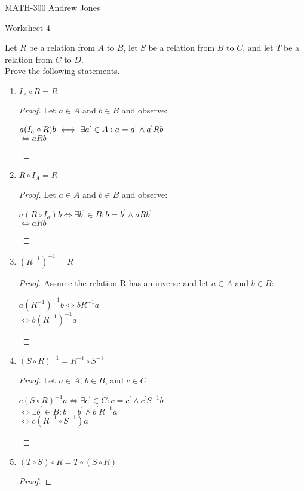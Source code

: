 \documentclass{article}
\begin{document}
    MATH-300 \hfill Andrew Jones
  \begin{center}
  {\huge Worksheet 4}
  \end{center}
  Let $R$ be a relation from $A$ to $B$, let $S$ be a relation from $B$ to $C$, and let $T$ be a relation from $C$ to $D$. \\ Prove the following statements. \\
  \begin{enumerate}
    \item $I_A \circ R = R$
      \begin{proof}
        Let $a\in A$ and $b\in B$ and observe:
        \begin{center}
          $a(I_a \circ R)b \iff \exists a^`\in A: a = a^` \wedge a^`Rb$ \\
          $\iff aRb$
        \end{center}
      \end{proof}
    \item $R \circ I_A = R$
      \begin{proof}
        Let $a\in A$ and $b\in B$ and observe:
        \begin{center}
          $a(R \circ I_a)b \iff \exists b^{'}\in B: b = b^{'} \wedge aRb^{'}$ \\
          $\iff aRb$
        \end{center}
      \end{proof}
    \item $(R^{-1})^{-1} = R$
      \begin{proof}
        Assume the relation R has an inverse and let $a\in A$ and $b\in B$:
        \begin{center}
          $a(R^{-1})^{-1}b \iff bR^{-1}a$ \\
          $\iff b(R^{-1})^{-1}a$
        \end{center}
      \end{proof}
    \item $(S \circ R)^{-1} = R^{-1}\circ S^{-1}$
      \begin{proof}
        Let $a\in A$, $b\in B$, and $c\in C$
        \begin{center}
          $c(S \circ R)^{-1}a \iff \exists c^{'}\in C: c = c^{'} \wedge c^{'}S^{-1}b$ \\
          $\iff \exists b^{'}\in B: b=b^{'} \wedge b^{'}R^{-1}a$ \\
          $\iff c(R^{-1} \circ S^{-1})a$
        \end{center}
      \end{proof}
    \item $(T \circ S) \circ R = T \circ (S \circ R)$
      \begin{proof}
        

\end{proof}
\end{enumerate}
\end{document}

